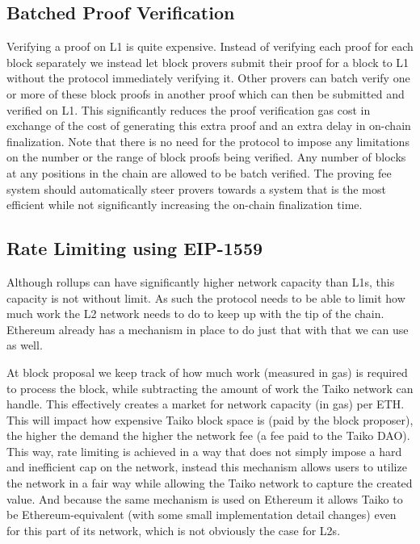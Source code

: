 \documentclass[9pt,oneside]{amsart}
\begin{document}
\begin{multicols}{2}
\subsection{Batched Proof Verification}\label{sec:proof-opt}
Verifying a proof on L1 is quite expensive. Instead of verifying each proof for each block separately we instead let block provers submit their proof for a block to L1 without the protocol immediately verifying it. Other provers can batch verify one or more of these block proofs in another proof which can then be submitted and verified on L1. This significantly reduces the proof verification gas cost in exchange of the cost of generating this extra proof and an extra delay in on-chain finalization. Note that there is no need for the protocol to impose any limitations on the number or the range of block proofs being verified. Any number of blocks at any positions in the chain are allowed to be batch verified. The proving fee system should automatically steer provers towards a system that is the most efficient while not significantly increasing the on-chain finalization time.

\subsection{Rate Limiting using EIP-1559}\label{sec:eip1559-propose}
Although rollups can have significantly higher network capacity than L1s, this capacity is not without limit. As such the protocol needs to be able to limit how much work the L2 network needs to do to keep up with the tip of the chain. Ethereum already has a mechanism in place to do just that with \cite{eip1559} that we can use as well. 

At block proposal we keep track of how much work (measured in gas) is required to process the block, while subtracting the amount of work the Taiko network can handle. This effectively creates a market for network capacity (in gas) per ETH. This will impact how expensive Taiko block space is (paid by the block proposer), the higher the demand the higher the network fee (a fee paid to the Taiko DAO). This way, rate limiting is achieved in a way that does not simply impose a hard and inefficient cap on the network, instead this mechanism allows users to utilize the network in a fair way while allowing the Taiko network to capture the created value. And because the same mechanism is used on Ethereum it allows Taiko to be Ethereum-equivalent (with some small implementation detail changes) even for this part of its network, which is not obviously the case for L2s.


\end{multicols}
\end{document}

